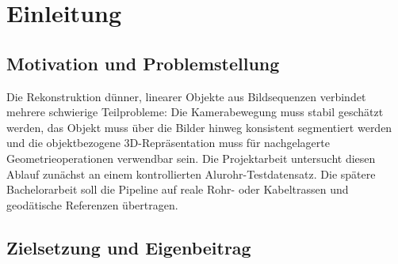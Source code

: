 \section{Einleitung}

\subsection{Motivation und Problemstellung}

Die Rekonstruktion dünner, linearer Objekte aus Bildsequenzen verbindet mehrere
schwierige Teilprobleme: Die Kamerabewegung muss stabil geschätzt werden, das
Objekt muss über die Bilder hinweg konsistent segmentiert werden und die
objektbezogene 3D-Repräsentation muss für nachgelagerte Geometrieoperationen
verwendbar sein. Die Projektarbeit untersucht diesen Ablauf zunächst an einem
kontrollierten Alurohr-Testdatensatz. Die spätere Bachelorarbeit soll die
Pipeline auf reale Rohr- oder Kabeltrassen und geodätische Referenzen
übertragen.

\subsection{Zielsetzung und Eigenbeitrag}

